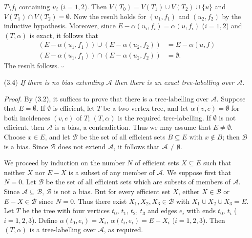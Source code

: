\noindent $T \setminus f_i$ containing $u_i$ ($i = 1, 2$). Then $V(T_0) = V(T_1) \cup V(T_2) \cup \{u\}$ and $V(T_1) \cap V(T_2) = \emptyset$. Now the result holds for $(u_1, f_1)$ and $(u_2, f_2)$ by the inductive hypothesis. Moreover, since $E - \alpha(u_i, f_i) = \alpha(u, f_i)$ ($i = 1, 2$) and $(T, \alpha)$ is exact, it follows that
\begin{align*}
(E - \alpha(u_1, f_1)) \cup (E - \alpha(u_2, f_2)) &= E - \alpha(u, f) \\
(E - \alpha(u_1, f_1)) \cap (E - \alpha(u_2, f_2)) &= \emptyset.
\end{align*}
The result follows. $\square$

\stmt
(3.4) \textit{If there is no bias extending $\mathscr{A}$ then there is an exact tree-labelling over $\mathscr{A}$.}

\textit{Proof.} By (3.2), it suffices to prove that there is a tree-labelling over $\mathscr{A}$. Suppose that $E = \emptyset$. If $\emptyset$ is efficient, let $T$ be a two-vertex tree, and let $\alpha(v, e) = \emptyset$ for both incidences $(v, e)$ of $T$; $(T, \alpha)$ is the required tree-labelling. If $\emptyset$ is not efficient, then $\mathscr{A}$ is a bias, a contradiction. Thus we may assume that $E \ne \emptyset$. Choose $x \in E$, and let $\mathscr{B}$ be the set of all efficient sets $B \subseteq E$ with $x \notin B$; then $\mathscr{B}$ is a bias. Since $\mathscr{B}$ does not extend $\mathscr{A}$, it follows that $\mathscr{A} \ne \emptyset$.

We proceed by induction on the number $N$ of efficient sets $X \subseteq E$ such that neither $X$ nor $E - X$ is a subset of any member of $\mathscr{A}$. We suppose first that $N = 0$. Let $\mathscr{B}$ be the set of all efficient sets which are subsets of members of $\mathscr{A}$. Since $\mathscr{A} \subseteq \mathscr{B}$, $\mathscr{B}$ is not a bias. But for every efficient set $X$, either $X \in \mathscr{B}$ or $E - X \in \mathscr{B}$ since $N = 0$. Thus there exist $X_1, X_2, X_3 \in \mathscr{B}$ with $X_1 \cup X_2 \cup X_3 = E$. Let $T$ be the tree with four vertices $t_0$, $t_1$, $t_2$, $t_3$ and edges $e_i$ with ends $t_0$, $t_i$ ($i = 1, 2, 3$). Define $\alpha(t_0, e_i) = X_i$, $\alpha(t_i, e_i) = E - X_i$ ($i = 1, 2, 3$). Then $(T, \alpha)$ is a tree-labelling over $\mathscr{A}$, as required.

